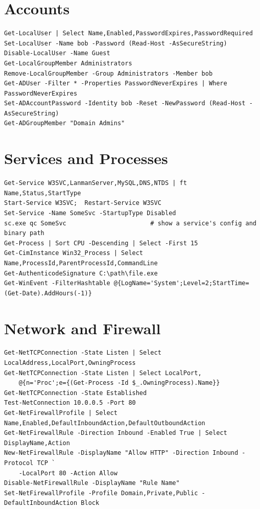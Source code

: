 \documentclass[11pt]{article}
\begin{document}
\section*{Accounts}
{\footnotesize
\begin{verbatim}
Get-LocalUser | Select Name,Enabled,PasswordExpires,PasswordRequired
Set-LocalUser -Name bob -Password (Read-Host -AsSecureString)
Disable-LocalUser -Name Guest
Get-LocalGroupMember Administrators
Remove-LocalGroupMember -Group Administrators -Member bob
Get-ADUser -Filter * -Properties PasswordNeverExpires | Where PasswordNeverExpires
Set-ADAccountPassword -Identity bob -Reset -NewPassword (Read-Host -AsSecureString)
Get-ADGroupMember "Domain Admins"
\end{verbatim}
}

\section*{Services and Processes}
{\footnotesize
\begin{verbatim}
Get-Service W3SVC,LanmanServer,MySQL,DNS,NTDS | ft Name,Status,StartType
Start-Service W3SVC;  Restart-Service W3SVC
Set-Service -Name SomeSvc -StartupType Disabled
sc.exe qc SomeSvc                       # show a service's config and binary path
Get-Process | Sort CPU -Descending | Select -First 15
Get-CimInstance Win32_Process | Select Name,ProcessId,ParentProcessId,CommandLine
Get-AuthenticodeSignature C:\path\file.exe
Get-WinEvent -FilterHashtable @{LogName='System';Level=2;StartTime=(Get-Date).AddHours(-1)}
\end{verbatim}
}

\section*{Network and Firewall}
{\footnotesize
\begin{verbatim}
Get-NetTCPConnection -State Listen | Select LocalAddress,LocalPort,OwningProcess
Get-NetTCPConnection -State Listen | Select LocalPort,
    @{n='Proc';e={(Get-Process -Id $_.OwningProcess).Name}}
Get-NetTCPConnection -State Established
Test-NetConnection 10.0.0.5 -Port 80
Get-NetFirewallProfile | Select Name,Enabled,DefaultInboundAction,DefaultOutboundAction
Get-NetFirewallRule -Direction Inbound -Enabled True | Select DisplayName,Action
New-NetFirewallRule -DisplayName "Allow HTTP" -Direction Inbound -Protocol TCP `
    -LocalPort 80 -Action Allow
Disable-NetFirewallRule -DisplayName "Rule Name"
Set-NetFirewallProfile -Profile Domain,Private,Public -DefaultInboundAction Block
\end{verbatim}
}
\end{document}
